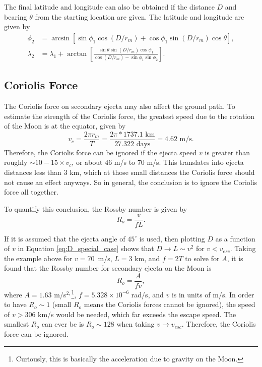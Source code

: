 \documentclass{article}
\begin{document}
The final latitude and longitude can also be obtained if the distance $D$ and bearing $\theta$ from the starting location are given. The latitude and longitude are given by
\begin{align}
\phi_2 &= \arcsin\left[\sin\phi_1\cos(D/r_m) + \cos\phi_1\sin(D/r_m)\cos\theta\right], \\
\lambda_2 &= \lambda_1 + \arctan\left[\frac{\sin\theta\sin(D/r_m)\cos\phi_1}{\cos(D/r_m) - \sin\phi_1\sin\phi_2}\right].
\end{align}


\subsection{Coriolis Force}

The Coriolis force on secondary ejecta may also affect the ground path. To estimate the strength of the Coriolis force, the greatest speed due to the rotation of the Moon is at the equator, given by
\begin{equation}
v_c = \frac{2\pi r_m}{T} = \frac{2\pi * 1737.1 \text{ km}}{27.322 \text{ days}} = 4.62 \text{ m/s}.
\end{equation}
Therefore, the Coriolis force can be ignored if the ejecta speed $v$ is greater than roughly  $\sim10-15\times v_c$, or about $46$ m/s to $70$ m/s. This translates into ejecta distances less than $3$ km, which at those small distances the Coriolis force should not cause an effect anyways. So in general, the conclusion is to ignore the Coriolis force all together.

To quantify this conclusion, the Rossby number is given by
\begin{equation}
R_o = \frac{v}{fL}.
\end{equation}

If it is assumed that the ejecta angle of $45^\circ$ is used, then plotting $D$ as a function of $v$ in Equation \eqref{eq:D_special_case} shows that $D \rightarrow L\sim v^2$ for $v<v_{esc}$. Taking the example above for $v=70$~m/s, $L = 3$ km, and $f = 2T$ to solve for $A$, it is found that the Rossby number for secondary ejecta on the Moon is
\begin{equation}
R_o = \frac{A}{fv},
\end{equation}
where $A = 1.63$ m/s$^{2,}$\footnote{Curiously, this is basically the acceleration due to gravity on the Moon.}, $f = 5.328\times 10^{-6}$ rad/s, and $v$ is in units of m/s. In order to have $R_o\sim 1$ (small $R_o$ means the Coriolis forces cannot be ignored), the speed of $v > 306$ km/s would be needed, which far exceeds the escape speed. The smallest $R_o$ can ever be is $R_o \sim 128$ when taking $v\to v_{esc}$. Therefore, the Coriolis force can be ignored.
\end{document}
